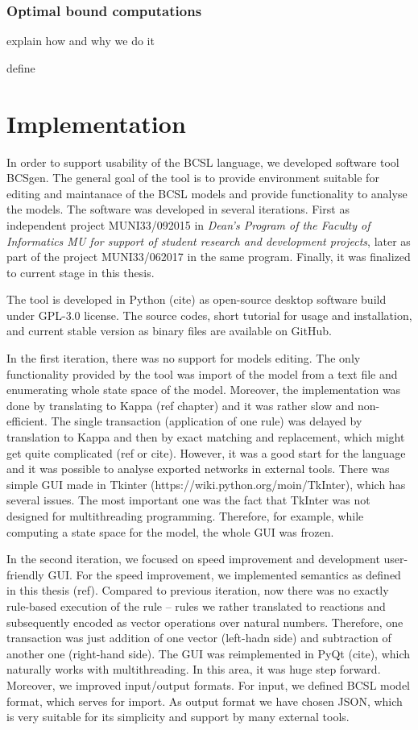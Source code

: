 \documentclass[12pt]{fithesis2}
\begin{document}
\subsection{Optimal bound computations}

explain how and why we do it

define

\chapter{Implementation}

In order to support usability of the BCSL language, we developed software tool BCSgen. The general goal of the tool is to provide environment suitable for editing and maintanace of the BCSL models and provide functionality to analyse the models. The software was developed in several iterations. First as independent project MUNI33/092015 in \emph{Dean's Program of the Faculty of Informatics MU for support of student research and development projects}, later as part of the project MUNI33/062017 in the same program. Finally, it was finalized to current stage in this thesis.

The tool is developed in Python (cite) as open-source desktop software build under GPL-3.0 license. The source codes, short tutorial for usage and installation, and current stable version as binary files are available on GitHub\footnotemark[1].

In the first iteration, there was no support for models editing. The only functionality provided by the tool was import of the model from a text file and enumerating whole state space of the model. Moreover, the implementation was done by translating to Kappa (ref chapter) and it was rather slow and non-efficient. The single transaction (application of one rule) was delayed by translation to Kappa and then by exact matching and replacement, which might get quite complicated (ref or cite). However, it was a good start for the language and it was possible to analyse exported networks in external tools. There was simple GUI made in Tkinter (https://wiki.python.org/moin/TkInter), which has several issues. The most important one was the fact that TkInter was not designed for multithreading programming. Therefore, for example, while computing a state space for the model, the whole GUI was frozen.

In the second iteration, we focused on speed improvement and development user-friendly GUI. For the speed improvement, we implemented semantics as defined in this thesis (ref). Compared to previous iteration, now there was no exactly rule-based execution of the rule -- rules we rather translated to reactions and subsequently encoded as vector operations over natural numbers. Therefore, one transaction was just addition of one vector (left-hadn side) and subtraction of another one (right-hand side). The GUI was reimplemented in PyQt (cite), which naturally works with multithreading. In this area, it was huge step forward. Moreover, we improved input/output formats. For input, we defined BCSL model format, which serves for import. As output format we have chosen JSON, which is very suitable for its simplicity and support by many external tools.
\end{document}
